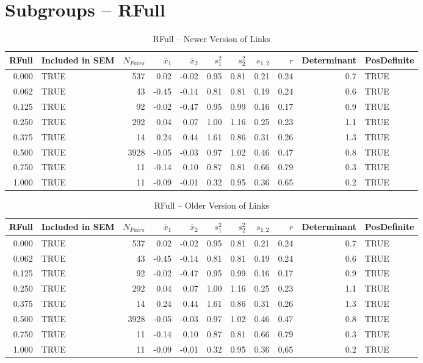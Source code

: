\documentclass{article}\usepackage[]{graphicx}\usepackage[]{color}
\begin{document}
\section{Subgroups --  RFull }%
\begin{table}[ht]
\centering
\begin{tabular}{rlrrrrrrrrl}
  \hline
RFull & Included in SEM & $N_{Pairs}$ & $\bar{x}_1$ & $\bar{x}_2$ & $s_1^2$ & $s_2^2$ & $s_{1,2}$ & $r$ & Determinant & PosDefinite \\ 
  \hline
0.000 & TRUE & 537 & 0.02 & -0.02 & 0.95 & 0.81 & 0.21 & 0.24 & 0.7 & TRUE \\ 
  0.062 & TRUE & 43 & -0.45 & -0.14 & 0.81 & 0.81 & 0.19 & 0.24 & 0.6 & TRUE \\ 
  0.125 & TRUE & 92 & -0.02 & -0.47 & 0.95 & 0.99 & 0.16 & 0.17 & 0.9 & TRUE \\ 
  0.250 & TRUE & 292 & 0.04 & 0.07 & 1.00 & 1.16 & 0.25 & 0.23 & 1.1 & TRUE \\ 
  0.375 & TRUE & 14 & 0.24 & 0.44 & 1.61 & 0.86 & 0.31 & 0.26 & 1.3 & TRUE \\ 
  0.500 & TRUE & 3928 & -0.05 & -0.03 & 0.97 & 1.02 & 0.46 & 0.47 & 0.8 & TRUE \\ 
  0.750 & TRUE & 11 & -0.14 & 0.10 & 0.87 & 0.81 & 0.66 & 0.79 & 0.3 & TRUE \\ 
  1.000 & TRUE & 11 & -0.09 & -0.01 & 0.32 & 0.95 & 0.36 & 0.65 & 0.2 & TRUE \\ 
   \hline
\end{tabular}
\caption{RFull -- Newer Version of Links} 
\end{table}
\begin{table}[ht]
\centering
\begin{tabular}{rlrrrrrrrrl}
  \hline
RFull & Included in SEM & $N_{Pairs}$ & $\bar{x}_1$ & $\bar{x}_2$ & $s_1^2$ & $s_2^2$ & $s_{1,2}$ & $r$ & Determinant & PosDefinite \\ 
  \hline
0.000 & TRUE & 537 & 0.02 & -0.02 & 0.95 & 0.81 & 0.21 & 0.24 & 0.7 & TRUE \\ 
  0.062 & TRUE & 43 & -0.45 & -0.14 & 0.81 & 0.81 & 0.19 & 0.24 & 0.6 & TRUE \\ 
  0.125 & TRUE & 92 & -0.02 & -0.47 & 0.95 & 0.99 & 0.16 & 0.17 & 0.9 & TRUE \\ 
  0.250 & TRUE & 292 & 0.04 & 0.07 & 1.00 & 1.16 & 0.25 & 0.23 & 1.1 & TRUE \\ 
  0.375 & TRUE & 14 & 0.24 & 0.44 & 1.61 & 0.86 & 0.31 & 0.26 & 1.3 & TRUE \\ 
  0.500 & TRUE & 3928 & -0.05 & -0.03 & 0.97 & 1.02 & 0.46 & 0.47 & 0.8 & TRUE \\ 
  0.750 & TRUE & 11 & -0.14 & 0.10 & 0.87 & 0.81 & 0.66 & 0.79 & 0.3 & TRUE \\ 
  1.000 & TRUE & 11 & -0.09 & -0.01 & 0.32 & 0.95 & 0.36 & 0.65 & 0.2 & TRUE \\ 
   \hline
\end{tabular}
\caption{RFull -- Older Version of Links} 
\end{table}
\end{document}
